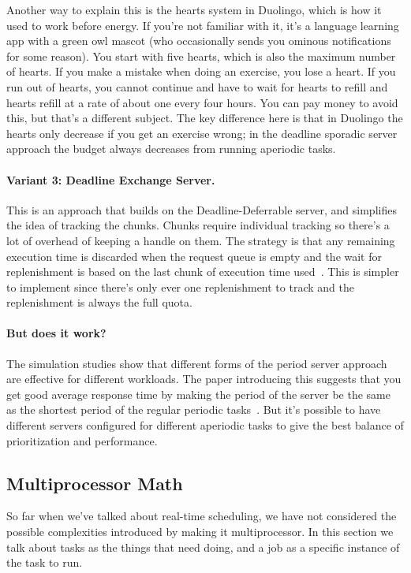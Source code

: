 Another way to explain this is the hearts system in Duolingo, which is how it used to work before energy. If you're not familiar with it, it's a language learning app with a green owl mascot (who occasionally sends you ominous notifications for some reason). You start with five hearts, which is also the maximum number of hearts. If you make a mistake when doing an exercise, you lose a heart. If you run out of hearts, you cannot continue and have to wait for hearts to refill and hearts refill at a rate of about one every four hours. You can pay money to avoid this, but that's a different subject. The key difference here is that in Duolingo the hearts only decrease if you get an exercise wrong; in the deadline sporadic server approach the budget always decreases from running aperiodic tasks.

\paragraph{Variant 3: Deadline Exchange Server.}
This is an approach that builds on the Deadline-Deferrable server, and simplifies the idea of tracking the chunks. Chunks require individual tracking so there's a lot of overhead of keeping a handle on them. The strategy is that any remaining execution time is discarded when the request queue is empty and the wait for replenishment is based on the last chunk of execution time used~\cite{aperiodic-server}. This is simpler to implement since there's only ever one replenishment to track and the replenishment is always the full quota. 

\paragraph{But does it work?}
The simulation studies show that different forms of the period server approach are effective for different workloads. The paper introducing this suggests that you get good average response time by making the period of the server be the same as the shortest period of the regular periodic tasks~\cite{aperiodic-server}. But it's possible to have different servers configured for different aperiodic tasks to give the best balance of prioritization and performance.

\subsection*{Multiprocessor Math}

So far when we've talked about real-time scheduling, we have not considered the possible complexities introduced by making it multiprocessor. In this section we talk about tasks as the things that need doing, and a job as a specific instance of the task to run.

